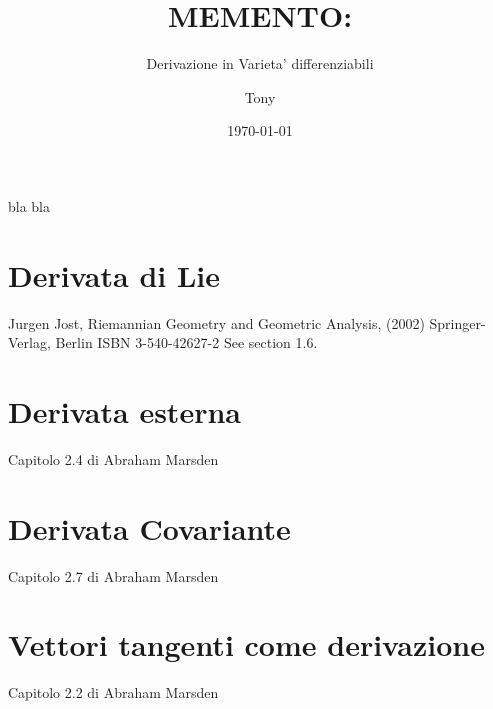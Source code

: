 \documentclass[a4paper,12pt]{scrartcl}    %
\begin{document}
	\title{MEMENTO:}
	\subtitle{Derivazione in Varieta' differenziabili}
	\author{Tony}
	\date{\today}
\maketitle

bla bla

\tableofcontents

\section{Derivata di Lie}
Jurgen Jost, Riemannian Geometry and Geometric Analysis, (2002) Springer-Verlag, Berlin ISBN 3-540-42627-2 See section 1.6.

\section{Derivata esterna}
Capitolo 2.4 di Abraham Marsden

\section{Derivata Covariante}
Capitolo 2.7 di Abraham Marsden

\section{Vettori tangenti come derivazione}
Capitolo 2.2 di Abraham Marsden
\end{document}
